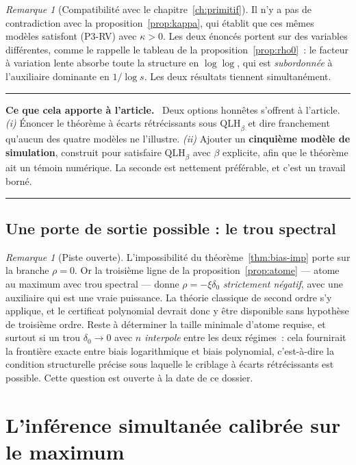 \documentclass[11pt]{article}
\theoremstyle{plain}
\theoremstyle{definition}
\theoremstyle{remark}
\newtheorem{remarque}[theoreme]{Remarque}
\newcommand{\1}{\mathbf 1}
\newenvironment{apport}
  {\par\medskip\noindent\begingroup\color{bleu}\rule{\linewidth}{0.6pt}\par
   \nobreak\vspace{2pt}\noindent\textbf{Ce que cela apporte à l'article.}\ \normalcolor}
  {\par\vspace{2pt}\noindent\textcolor{bleu}{\rule{\linewidth}{0.6pt}}\endgroup\par\medskip}
\begin{document}
\begin{remarque}[Compatibilité avec le chapitre~\ref{ch:primitif}]
Il n'y a pas de contradiction avec la
proposition~\ref{prop:kappa}, qui établit que ces mêmes modèles
satisfont (P3-RV) avec $\kappa>0$. Les deux énoncés portent sur des
variables différentes, comme le rappelle le tableau de la
proposition~\ref{prop:rho0}~: le facteur à variation lente absorbe toute
la structure en $\log\log$, qui est \emph{subordonnée} à l'auxiliaire
dominante en $1/\log s$. Les deux résultats tiennent simultanément.
\end{remarque}

\begin{apport}
Deux options honnêtes s'offrent à l'article. \emph{(i)} Énoncer le
théorème à écarts rétrécissants sous $\mathrm{QLH}_\beta$ et dire
franchement qu'aucun des quatre modèles ne l'illustre. \emph{(ii)}
Ajouter un \textbf{cinquième modèle de simulation}, construit pour
satisfaire $\mathrm{QLH}_\beta$ avec $\beta$ explicite, afin que le
théorème ait un témoin numérique. La seconde est nettement préférable, et
c'est un travail borné.
\end{apport}

\subsection{Une porte de sortie possible : le trou spectral}\label{sec:trou}

\begin{remarque}[Piste ouverte]
L'impossibilité du théorème~\ref{thm:bias-imp} porte sur la branche
$\rho=0$. Or la troisième ligne de la
proposition~\ref{prop:atome} --- atome au maximum avec trou spectral ---
donne $\rho=-\xi\delta_0$ \emph{strictement négatif}, avec une auxiliaire
qui est une vraie puissance. La théorie classique de second ordre s'y
applique, et le certificat polynomial devrait donc y être disponible sans
hypothèse de troisième ordre. Reste à déterminer la taille minimale
d'atome requise, et surtout si un trou $\delta_0\to0$ avec $n$
\emph{interpole} entre les deux régimes~: cela fournirait la frontière
exacte entre biais logarithmique et biais polynomial, c'est-à-dire la
condition structurelle précise sous laquelle le criblage à écarts
rétrécissants est possible. Cette question est ouverte à la date de ce
dossier.
\end{remarque}

\clearpage

\section{L'inférence simultanée calibrée sur le maximum}\label{ch:inference}
\end{document}
